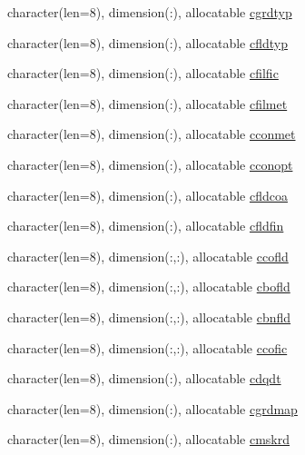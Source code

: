 \begin{DoxyCompactItemize}
\item 
character(len=8), dimension(\+:), allocatable \hyperlink{namespacemod__oasis__namcouple_a795db0909c85ffadb601b744b5189ff5}{cgrdtyp}
\item 
character(len=8), dimension(\+:), allocatable \hyperlink{namespacemod__oasis__namcouple_ab139e7bad0413c79a5ad8e0837d3e0ef}{cfldtyp}
\item 
character(len=8), dimension(\+:), allocatable \hyperlink{namespacemod__oasis__namcouple_a6a69d927924d3fa391fdc3ec6cb78197}{cfilfic}
\item 
character(len=8), dimension(\+:), allocatable \hyperlink{namespacemod__oasis__namcouple_adf402f22f61893178fadcefe43b91102}{cfilmet}
\item 
character(len=8), dimension(\+:), allocatable \hyperlink{namespacemod__oasis__namcouple_a535fadd17426c228698e3a51fd54b605}{cconmet}
\item 
character(len=8), dimension(\+:), allocatable \hyperlink{namespacemod__oasis__namcouple_a240979dfe7369da899b0cfe2aeba4f9d}{cconopt}
\item 
character(len=8), dimension(\+:), allocatable \hyperlink{namespacemod__oasis__namcouple_af3a308fee2e4b00a1380035e41113d36}{cfldcoa}
\item 
character(len=8), dimension(\+:), allocatable \hyperlink{namespacemod__oasis__namcouple_aa387fcfde8c2538e22897b243ff5024c}{cfldfin}
\item 
character(len=8), dimension(\+:,\+:), allocatable \hyperlink{namespacemod__oasis__namcouple_af8d81a53bd28ddf6bfe19f5e05f1d867}{ccofld}
\item 
character(len=8), dimension(\+:,\+:), allocatable \hyperlink{namespacemod__oasis__namcouple_ab0f93bb917e445dc4e55fc2326168a42}{cbofld}
\item 
character(len=8), dimension(\+:,\+:), allocatable \hyperlink{namespacemod__oasis__namcouple_af5bfb0fe58a77461130b9967fa7a4d5e}{cbnfld}
\item 
character(len=8), dimension(\+:,\+:), allocatable \hyperlink{namespacemod__oasis__namcouple_a009543dda4495ab9b5ac3fcf15767682}{ccofic}
\item 
character(len=8), dimension(\+:), allocatable \hyperlink{namespacemod__oasis__namcouple_a9c5a3b3a864f3feb95eddc08616b998e}{cdqdt}
\item 
character(len=8), dimension(\+:), allocatable \hyperlink{namespacemod__oasis__namcouple_affa01947af89e5cdad5f33fba2a53d22}{cgrdmap}
\item 
character(len=8), dimension(\+:), allocatable \hyperlink{namespacemod__oasis__namcouple_a28c3f9e076a686c8ef916221e8fe4e10}{cmskrd}

\end{DoxyCompactItemize}
